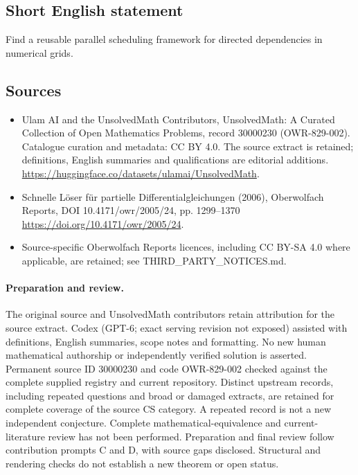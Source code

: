 \documentclass[11pt]{article}
\begin{document}
\subsection{Short English statement}
Find a reusable parallel scheduling framework for directed dependencies in numerical grids.
\subsection{Sources}
\begin{itemize}
\item[\hypertarget{source:30000230:1}{S1}] Ulam AI and the UnsolvedMath Contributors, UnsolvedMath: A Curated Collection of Open Mathematics Problems, record 30000230 (OWR-829-002). Catalogue curation and metadata: CC BY 4.0. The source extract is retained; definitions, English summaries and qualifications are editorial additions.
\url{https://huggingface.co/datasets/ulamai/UnsolvedMath}.
\item[\hypertarget{source:30000230:2}{S2}] Schnelle Löser für partielle Differentialgleichungen (2006), Oberwolfach Reports, DOI 10.4171/owr/2005/24, pp. 1299--1370
\url{https://doi.org/10.4171/owr/2005/24}.
\item Source-specific Oberwolfach Reports licences, including CC BY-SA 4.0 where applicable, are retained; see THIRD\_PARTY\_NOTICES.md.
\end{itemize}
\paragraph{Preparation and review.}
The original source and UnsolvedMath contributors retain attribution for the source extract. Codex (GPT-6; exact serving revision not exposed) assisted with definitions, English summaries, scope notes and formatting. No new human mathematical authorship or independently verified solution is asserted. Permanent source ID 30000230 and code OWR-829-002 checked against the complete supplied registry and current repository. Distinct upstream records, including repeated questions and broad or damaged extracts, are retained for complete coverage of the source CS category. A repeated record is not a new independent conjecture. Complete mathematical-equivalence and current-literature review has not been performed. Preparation and final review follow contribution prompts C and D, with source gaps disclosed. Structural and rendering checks do not establish a new theorem or open status.
\label{end:30000230}
\end{document}
